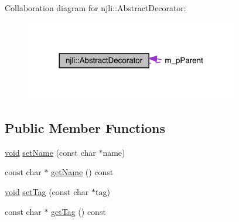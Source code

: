 Collaboration diagram for njli\+:\+:Abstract\+Decorator\+:\nopagebreak
\begin{figure}[H]
\begin{center}
\leavevmode
\includegraphics[width=264pt]{classnjli_1_1_abstract_decorator__coll__graph}
\end{center}
\end{figure}
\subsection*{Public Member Functions}
\begin{DoxyCompactItemize}
\item 
\mbox{\hyperlink{_thread_8h_af1e856da2e658414cb2456cb6f7ebc66}{void}} \mbox{\hyperlink{classnjli_1_1_abstract_decorator_a087eb5f8d9f51cc476f12f1d10a3cb95}{set\+Name}} (const char $\ast$name)
\item 
const char $\ast$ \mbox{\hyperlink{classnjli_1_1_abstract_decorator_ad41266885be835f3ee602311e20877a4}{get\+Name}} () const
\item 
\mbox{\hyperlink{_thread_8h_af1e856da2e658414cb2456cb6f7ebc66}{void}} \mbox{\hyperlink{classnjli_1_1_abstract_decorator_a45a6af60b195efd39b1b56f19a8ef14a}{set\+Tag}} (const char $\ast$tag)
\item 
const char $\ast$ \mbox{\hyperlink{classnjli_1_1_abstract_decorator_a1892eb8a5216ffbbe937e747a0d1d141}{get\+Tag}} () const
\end{DoxyCompactItemize}
